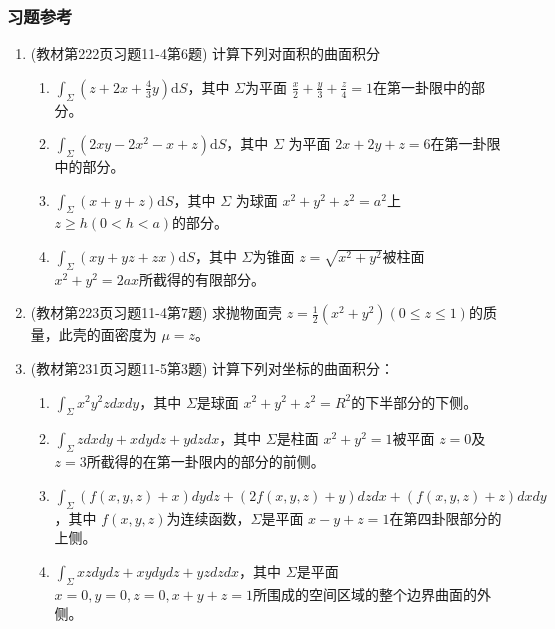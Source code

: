 \subsubsection{习题参考}
\begin{enumerate}
    \item (教材第222页习题11-4第6题) 计算下列对面积的曲面积分
        \begin{enumerate}[(1)]
            \item $\int _\Sigma (z + 2x + \frac{4}{3}y) \mathrm{d} S$，其中 $\Sigma$为平面 $\frac{x}{2} + \frac{y}{3} + \frac{z}{4} =1$在第一卦限中的部分。
    
            \item $\int _\Sigma (2xy - 2x^2 -x + z) \mathrm{d}S$，其中 $\Sigma$ 为平面 $2x + 2y + z=6$在第一卦限中的部分。
    
            \item $\int _\Sigma (x+y+z) \mathrm{d}S$，其中 $\Sigma$ 为球面 $x^2 + y^2 + z^2=a^2$上 $z \ge h(0 < h < a)$的部分。
    
            \item $\int _\Sigma (xy + yz + zx)\mathrm{d}S$，其中 $\Sigma$为锥面 $z=\sqrt{x^2 + y^2}$被柱面 $x^2 + y^2 = 2ax$所截得的有限部分。
        \end{enumerate}
    
    \item (教材第223页习题11-4第7题) 求抛物面壳 $z = \frac{1}{2}(x^2 + y^2)(0 \le z \le 1)$的质量，此壳的面密度为 $\mu =z$。
    
    \item (教材第231页习题11-5第3题) 计算下列对坐标的曲面积分：
        \begin{enumerate}[(1)]
            \item $\int _\Sigma x^2y^2z dxdy$，其中 $\Sigma$是球面 $x^2 + y^2 + z^2=R^2$的下半部分的下侧。
            
            \item $\int _\Sigma z dxdy + x dydz + y dzdx$，其中 $\Sigma$是柱面 $x^2 + y^2 =1$被平面 $z=0$及 $z=3$所截得的在第一卦限内的部分的前侧。
    
            \item $\int _\Sigma \left( f(x,y,z) + x\right) dydz + \left( 2f(x,y,z) +y \right) dzdx + \left( f(x,y,z) + z \right) dxdy$，其中 $f(x,y,z)$为连续函数，$\Sigma$是平面 $x-y+z=1$在第四卦限部分的上侧。
    
            \item $\int _\Sigma xz dydz + xydydz + yz dzdx$，其中 $\Sigma$是平面 $x=0,y=0,z=0,x+y+z=1$所围成的空间区域的整个边界曲面的外侧。
        \end{enumerate}
    

\end{enumerate}
